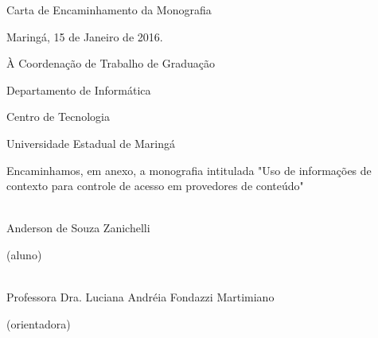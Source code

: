 
\vspace{5cm}
Carta de Encaminhamento da Monografia

\vspace{2cm}
\hfill Maringá, 15 de Janeiro de 2016.

\vspace{3cm}
À Coordenação de Trabalho de Graduação

Departamento de Informática

Centro de Tecnologia

Universidade Estadual de Maringá

\vspace{3cm}
Encaminhamos, em anexo, a monografia intitulada "Uso de informações de contexto para controle de acesso em provedores de conteúdo"

\centering
\vspace{3cm}

\makebox[3in]{\hrulefill}\\
Anderson de Souza Zanichelli

(aluno)

\vspace{3cm}
\makebox[3in]{\hrulefill}\\
Professora Dra. Luciana Andréia Fondazzi Martimiano

(orientadora)